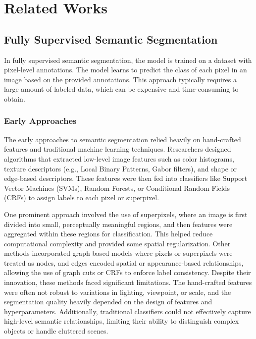 \chapter {Related Works}
\label{chap:related-works}

\section{Fully Supervised Semantic Segmentation}
\label{sec:fully-supervised}

In fully supervised semantic segmentation, the model is trained on a dataset with pixel-level annotations. The model learns to predict the class of each pixel in an image based on the provided annotations. This approach typically requires a large amount of labeled data, which can be expensive and time-consuming to obtain.

\subsection{Early Approaches}
\label{subsec:early-approaches}

The early approaches to semantic segmentation relied heavily on hand-crafted features and traditional machine learning techniques. Researchers designed algorithms that extracted low-level image features such as color histograms, texture descriptors (e.g., Local Binary Patterns, Gabor filters), and shape or edge-based descriptors. These features were then fed into classifiers like Support Vector Machines (SVMs), Random Forests, or Conditional Random Fields (CRFs) to assign labels to each pixel or superpixel.

One prominent approach involved the use of superpixels, where an image is first divided into small, perceptually meaningful regions, and then features were aggregated within these regions for classification. This helped reduce computational complexity and provided some spatial regularization. Other methods incorporated graph-based models where pixels or superpixels were treated as nodes, and edges encoded spatial or appearance-based relationships, allowing the use of graph cuts or CRFs to enforce label consistency. Despite their innovation, these methods faced significant limitations. The hand-crafted features were often not robust to variations in lighting, viewpoint, or scale, and the segmentation quality heavily depended on the design of features and hyperparameters. Additionally, traditional classifiers could not effectively capture high-level semantic relationships, limiting their ability to distinguish complex objects or handle cluttered scenes.

